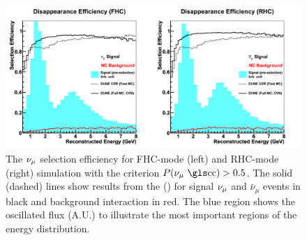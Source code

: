 \begin{figure}
    \centering
		\includegraphics[width=0.9\linewidth]{graphics/cpv_compare_effs_dis_cvnvcdr_dec2018_newcolor.png} 
	\caption[The $\numu$ CC selection efficiency for $P(\numu \textrm{CC}) > 0.5$]{The $\numu$  selection efficiency for FHC-mode (left) and RHC-mode (right) simulation with the criterion $P(\numu \textrm{ \dword{cc}}) > 0.5$. The solid (dashed) lines show results from the  () for signal $\numu$  and $\bar{\nu}_\mu$  events in black and  background interaction in red. The blue region shows the oscillated flux (A.U.) to illustrate the most important regions of the energy distribution.}
    \label{fig:numueff}
\end{figure}


